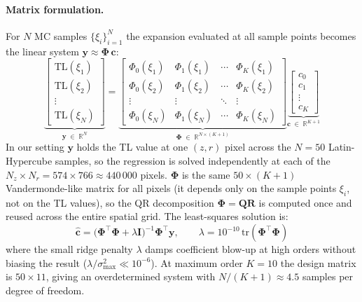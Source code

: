 \documentclass[11pt,a4paper]{article}
\newcommand{\TL}{\mathrm{TL}}
\begin{document}
\paragraph{Matrix formulation.}
For $N$ MC samples $\{\xi_i\}_{i=1}^N$ the expansion evaluated at all sample points
becomes the linear system $\mathbf{y} \approx \boldsymbol\Phi\,\mathbf{c}$:
\begin{equation}
  \underbrace{\begin{bmatrix} \TL(\xi_1) \\ \TL(\xi_2) \\ \vdots \\ \TL(\xi_N) \end{bmatrix}}_{\mathbf{y}\;\in\;\mathbb{R}^{N}}
  =
  \underbrace{\begin{bmatrix}
    \Phi_0(\xi_1) & \Phi_1(\xi_1) & \cdots & \Phi_K(\xi_1) \\
    \Phi_0(\xi_2) & \Phi_1(\xi_2) & \cdots & \Phi_K(\xi_2) \\
    \vdots        & \vdots        & \ddots & \vdots        \\
    \Phi_0(\xi_N) & \Phi_1(\xi_N) & \cdots & \Phi_K(\xi_N)
  \end{bmatrix}}_{\boldsymbol\Phi\;\in\;\mathbb{R}^{N\times(K+1)}}
  \underbrace{\begin{bmatrix} c_0 \\ c_1 \\ \vdots \\ c_K \end{bmatrix}}_{\mathbf{c}\;\in\;\mathbb{R}^{K+1}}
  \label{eq:pce_matrix}
\end{equation}
In our setting $\mathbf{y}$ holds the TL value at one $(z,r)$ pixel across the $N=50$
Latin-Hypercube samples, so the regression is solved independently at each of the
$N_z \times N_r = 574 \times 766 \approx 440\,000$ pixels.
$\boldsymbol\Phi$ is the same $50\times(K+1)$ Vandermonde-like matrix for all pixels
(it depends only on the sample points $\xi_i$, not on the TL values), so the QR
decomposition $\boldsymbol\Phi = \mathbf{Q}\mathbf{R}$ is computed once and reused
across the entire spatial grid.
The least-squares solution is:
\begin{equation}
  \hat{\mathbf{c}} = \bigl(\boldsymbol\Phi^\top\boldsymbol\Phi
                    + \lambda\mathbf{I}\bigr)^{-1}\boldsymbol\Phi^\top\mathbf{y},
  \qquad
  \lambda = 10^{-10}\,\mathrm{tr}(\boldsymbol\Phi^\top\boldsymbol\Phi)
  \label{eq:pce_ridge}
\end{equation}
where the small ridge penalty $\lambda$ damps coefficient blow-up at high orders
without biasing the result ($\lambda/\sigma_{\max}^2 \ll 10^{-6}$).
At maximum order $K=10$ the design matrix is $50\times11$, giving an
overdetermined system with $N/(K+1)\approx4.5$ samples per degree of freedom.
\end{document}
